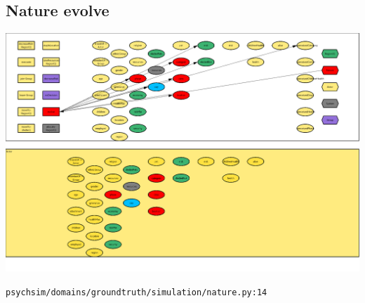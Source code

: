 \documentclass{article}%
\begin{document}
\subsection{Nature evolve}%
\label{subsec:Nature evolve}%
\includegraphics[width=\textwidth]{images/Nature-evolve.png}%
\begin{flushleft}%
\verb|psychsim/domains/groundtruth/simulation/nature.py:14|%
\end{flushleft}%
\end{document}
